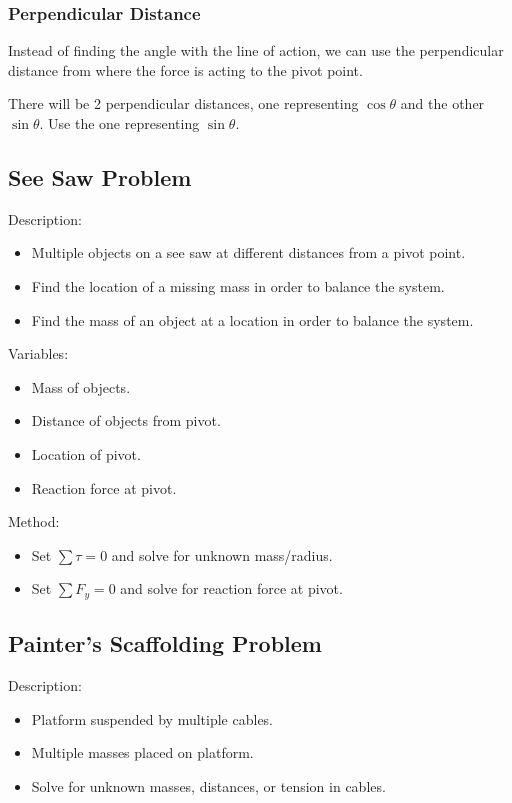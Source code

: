 \documentclass[a4paper,11pt]{article}
\begin{document}
\subsubsection{Perpendicular Distance}

Instead of finding the angle with the line of action, we can use the
perpendicular distance from where the force is acting to the pivot point.

There will be 2 perpendicular distances, one representing $\cos{\theta}$ and
the other $\sin{\theta}$.
Use the one representing $\sin{\theta}$.


\subsection{See Saw Problem}

Description:

\begin{itemize}
\item Multiple objects on a see saw at different distances from a pivot point.
\item Find the location of a missing mass in order to balance the system.
\item Find the mass of an object at a location in order to balance the system.
\end{itemize}

Variables:

\begin{itemize}
\item Mass of objects.
\item Distance of objects from pivot.
\item Location of pivot.
\item Reaction force at pivot.
\end{itemize}

Method:

\begin{itemize}
\item Set $\sum \tau = 0$ and solve for unknown mass/radius.
\item Set $\sum F_y = 0$ and solve for reaction force at pivot.
\end{itemize}


\subsection{Painter's Scaffolding Problem}

Description:

\begin{itemize}
\item Platform suspended by multiple cables.
\item Multiple masses placed on platform.
\item Solve for unknown masses, distances, or tension in cables.
\end{itemize}
\end{document}
